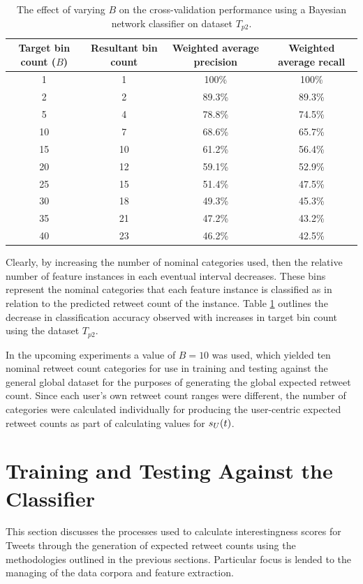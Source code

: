 \begin{table}[h]\footnotesize
\begin{center}
\begin{tabular}{ c | c | c | c }
	Target bin count ($B$)	& Resultant bin count & Weighted average precision &  Weighted average recall \\
	\hline
	\hline 
    1 & 1 & 100\% & 100\% \\
    2 & 2 & 89.3\% & 89.3\% \\
    5 & 4 & 78.8\%  & 74.5\% \\
    10 & 7 & 68.6\% & 65.7\% \\
    15 & 10 & 61.2\% & 56.4\% \\
    20 & 12 & 59.1\% & 52.9\% \\
    25 & 15 & 51.4\% & 47.5\% \\
    30 & 18 & 49.3\% & 45.3\% \\
    35 & 21 & 47.2\% & 43.2\% \\
    40 & 23 & 46.2\% & 42.5\% \\
    \hline  
\end{tabular}
\end{center}
\caption{The effect of varying $B$ on the cross-validation performance using a Bayesian network classifier on dataset $T_{p2}$.}
\label{table:binperformance}
\end{table}

Clearly, by increasing the number of nominal categories used, then the relative number of feature instances in each eventual interval decreases. These bins represent the nominal categories that each feature instance is classified as in relation to the predicted retweet count of the instance. Table \ref{table:binperformance} outlines the decrease in classification accuracy observed with increases in target bin count using the dataset $T_{p2}$.

In the upcoming experiments a value of $B = 10$ was used, which yielded ten nominal retweet count categories for use in training and testing against the general global dataset for the purposes of generating the global expected retweet count. Since each user's own retweet count ranges were different, the number of categories were calculated individually for producing the user-centric expected retweet counts as part of calculating values for $s_U(t)$.


\section{Training and Testing Against the Classifier}
This section discusses the processes used to calculate interestingness scores for Tweets through the generation of expected retweet counts using the methodologies outlined in the previous sections. Particular focus is lended to the managing of the data corpora and feature extraction.


